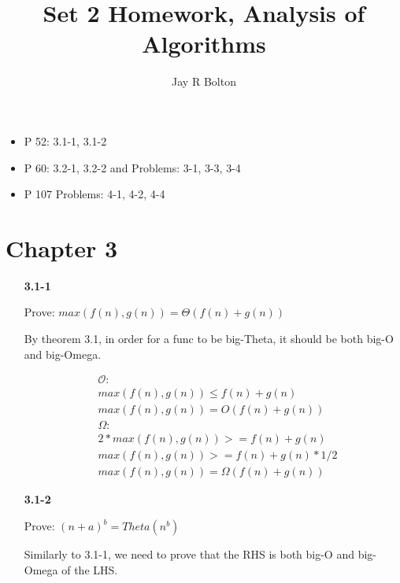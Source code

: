 \documentclass{article}
\title{Set 2 Homework, Analysis of Algorithms}
\author{Jay R Bolton}
\begin{document}
\maketitle

\begin{itemize}
\item P 52: 3.1-1, 3.1-2
\item P 60: 3.2-1, 3.2-2 and Problems: 3-1, 3-3, 3-4
\item P 107 Problems: 4-1, 4-2, 4-4
\end{itemize}


\section*{Chapter 3}

\begin{enumerate}

\item[\textbf{3.1-1}]

  Prove: $max(f(n), g(n)) = \Theta(f(n) + g(n))$

  By theorem 3.1, in order for a func to be big-Theta, it should be both big-O
  and big-Omega.
  
	\begin{align*}
  & \mathcal{O} : \\
  & max(f(n), g(n)) \leq f(n) + g(n) \\
  & max(f(n), g(n)) = O(f(n) + g(n)) \\
  & \Omega : \\
  & 2 * max(f(n), g(n)) >= f(n) + g(n) \\
  & max(f(n), g(n)) >= f(n) + g(n) * 1/2 \\
  & max(f(n), g(n)) = \Omega(f(n) + g(n))
	\end{align*}

\item[\textbf{3.1-2}]

  Prove: $ (n + a)^b = Theta(n^b) $

  Similarly to 3.1-1, we need to prove that the RHS is both big-O and big-Omega
  of the LHS.
  

\end{enumerate}
\end{document}
